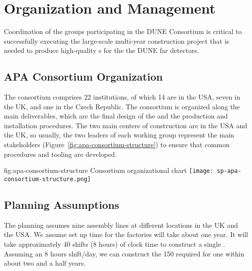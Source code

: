 \section{Organization and Management}
\label{sec:fdsp-apa-org}

Coordination of the groups participating in the DUNE  Consortium is critical to successfully executing the large-scale multi-year construction project that is needed to produce high-quality s for the the DUNE far detectors.  


\subsection{APA Consortium Organization}
\label{sec:fdsp-apa-org-consortium}

The  consortium comprises \num{22} institutions, of which \num{14} are in the USA, seven in the UK, and one in the Czech Republic. The consortium is organized along the main deliverables, which are the final design of the  and the  production and installation procedures. The two main centers of  construction are in the USA and the UK, so usually, the two leaders of each working group represent the main stakeholders (Figure~\ref{fig:apa-consortium-structure}) to ensure that common procedures and tooling are developed. 

\begin{dunefigure}{fig:apa-consortium-structure}
{ Consortium organizational chart}
\texttt{[image: sp-apa-consortium-structure.png]}
\end{dunefigure}


\subsection{Planning Assumptions}
\label{sec:fdsp-apa-org-assmp}

The planning assumes nine  assembly lines at different locations in the UK and the USA. 
We assume set up time for the factories will take about one year.
It will take approximately \num{40} shifts (8 hours) of clock time  to construct a single . Assuming an 8 hours shift/day, we can construct the \num{150}  required for one  %
within about two and a half years.

